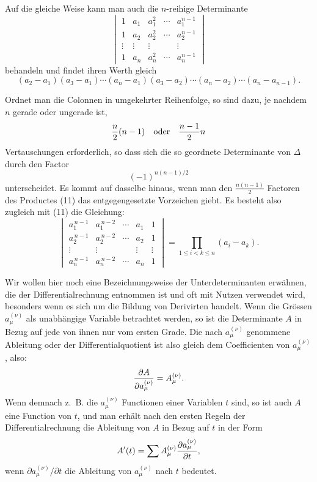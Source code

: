 \documentclass[11pt]{article}
\begin{document}
Auf die gleiche Weise kann man auch die \(n\)-reihige Determinante
\[
\begin{vmatrix}
1&a_1&a_1^2&\cdots&a_1^{n-1}\\
1&a_2&a_2^2&\cdots&a_2^{n-1}\\
\vdots&\vdots&\vdots&&\vdots\\
1&a_n&a_n^2&\cdots&a_n^{n-1}
\end{vmatrix}
\]
behandeln und findet ihren Werth gleich
\begin{equation}
(a_2-a_1)(a_3-a_1)\cdots(a_n-a_1)
(a_3-a_2)\cdots(a_n-a_2)\cdots(a_n-a_{n-1}).
\tag{11}
\end{equation}

Ordnet man die Colonnen in umgekehrter Reihenfolge, so sind dazu, je nachdem \(n\) gerade oder ungerade ist,
\[
{n\over2}(n-1)\quad \hbox{oder}\quad {n-1\over2}n
\]
Vertauschungen erforderlich, so dass sich die so geordnete Determinante von \(\Delta\) durch den Factor
\[
(-1)^{n(n-1)/2}
\]
unterscheidet. Es kommt auf dasselbe hinaus, wenn man den \(\frac{n(n-1)}2\) Factoren des Productes (11) das entgegengesetzte Vorzeichen giebt. Es besteht also zugleich mit (11) die Gleichung:
\begin{equation}
\begin{vmatrix}
a_1^{\,n-1}&a_1^{\,n-2}&\cdots&a_1&1\\
a_2^{\,n-1}&a_2^{\,n-2}&\cdots&a_2&1\\
\vdots&\vdots&&\vdots&\vdots\\
a_n^{\,n-1}&a_n^{\,n-2}&\cdots&a_n&1
\end{vmatrix}
=
\prod_{1\le i<k\le n}(a_i-a_k).
\tag{12}
\end{equation}

Wir wollen hier noch eine Bezeichnungsweise der Unterdeterminanten erwähnen, die der Differentialrechnung entnommen ist und oft mit Nutzen verwendet wird, besonders wenn es sich um die Bildung von Derivirten handelt. Wenn die Grössen \(a_\mu^{(\nu)}\) als unabhängige Variable betrachtet werden, so ist die Determinante \(A\) in Bezug auf jede von ihnen nur vom ersten Grade. Die nach \(a_\mu^{(\nu)}\) genommene Ableitung oder der Differentialquotient ist also gleich dem Coefficienten von \(a_\mu^{(\nu)}\), also:
\[
{\partial A\over \partial a_\mu^{(\nu)}}=A_\mu^{(\nu)}.
\]
Wenn demnach z.~B. die \(a_\mu^{(\nu)}\) Functionen einer Variablen \(t\) sind, so ist auch \(A\) eine Function von \(t\), und man erhält nach den ersten Regeln der Differentialrechnung die Ableitung von \(A\) in Bezug auf \(t\) in der Form
\[
A'(t)=\sum A_\mu^{(\nu)}{\partial a_\mu^{(\nu)}\over\partial t},
\]
wenn \({\partial a_\mu^{(\nu)}}/{\partial t}\) die Ableitung von \(a_\mu^{(\nu)}\) nach \(t\) bedeutet.
\end{document}
